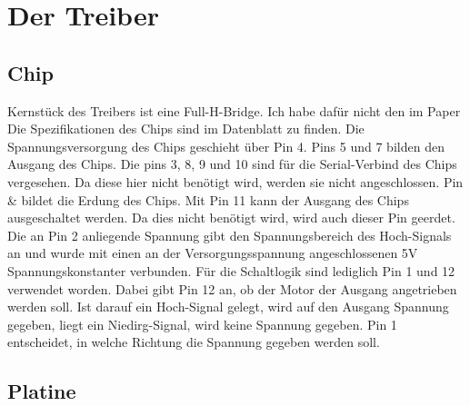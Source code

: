 \section{Der Treiber}

\subsection{Chip}

Kernstück des Treibers ist eine Full-H-Bridge.
Ich habe dafür nicht den im Paper %
Die Spezifikationen des Chips sind im Datenblatt zu finden.%
Die Spannungsversorgung des Chips geschieht über Pin 4. Pins 5 und 7 bilden den Ausgang des Chips. Die pins 3, 8, 9 und 10 sind für die Serial-Verbind des Chips vergesehen. Da diese hier nicht benötigt wird, werden sie nicht angeschlossen. Pin & bildet die Erdung des Chips. Mit Pin 11 kann der Ausgang des Chips ausgeschaltet werden. Da dies nicht benötigt wird, wird auch dieser Pin geerdet. Die an Pin 2 anliegende Spannung gibt den Spannungsbereich des Hoch-Signals an und wurde mit einen an der Versorgungsspannung angeschlossenen 5V Spannungskonstanter verbunden. Für die Schaltlogik sind lediglich Pin 1 und 12 verwendet worden. Dabei gibt Pin 12 an, ob der Motor der Ausgang angetrieben werden soll. Ist darauf ein Hoch-Signal gelegt, wird auf den Ausgang Spannung gegeben, liegt ein Niedirg-Signal, wird keine Spannung gegeben. Pin 1 entscheidet, in welche Richtung die Spannung gegeben werden soll.


\subsection{Platine}

